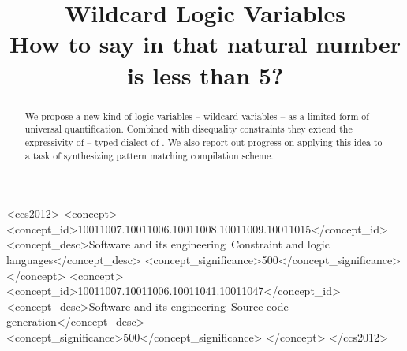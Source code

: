 \documentclass
  [sigplan
  ,screen
  ,review
  ]{acmart}
\begin{document}
\title{Wildcard Logic Variables\\
  \large  How to say in \miniKanren{} that natural number is less than 5? }






%

\begin{abstract}
We propose a new kind of logic variables -- wildcard variables -- as a limited form of universal quantification. Combined with disequality constraints they extend the expressivity of \OCanren{} -- typed dialect of \miniKanren{}. We also report out progress on applying this idea to a task of synthesizing pattern matching compilation scheme.
\end{abstract}


\begin{CCSXML}
<ccs2012>
<concept>
<concept_id>10011007.10011006.10011008.10011009.10011015</concept_id>
<concept_desc>Software and its engineering~Constraint and logic languages</concept_desc>
<concept_significance>500</concept_significance>
</concept>
<concept>
<concept_id>10011007.10011006.10011041.10011047</concept_id>
<concept_desc>Software and its engineering~Source code generation</concept_desc>
<concept_significance>500</concept_significance>
</concept>
</ccs2012>
\end{CCSXML}
\end{document}
